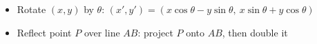 \begin{itemize}
  \item Rotate $(x,y)$ by $\theta$: $(x',y') = (x\cos\theta - y\sin\theta,\ x\sin\theta + y\cos\theta)$
  \item Reflect point $P$ over line $AB$: project $P$ onto $AB$, then double it
\end{itemize}
